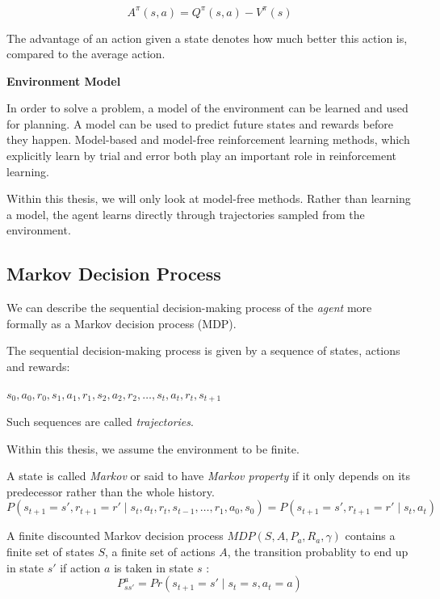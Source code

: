 \begin{equation}
A^\pi(s,a) = Q^\pi(s,a)-V^\pi(s)
\label{adv}
\end{equation}

The advantage of an action given a state denotes how much better this action is, compared to the average action.

\textbf{Environment Model}

In order to solve a problem, a model of the environment can be learned and used for planning. A model can be used to predict future states and rewards before they happen.
Model-based and model-free reinforcement learning methods, which explicitly learn by trial and error both play an important role in reinforcement learning.

Within this thesis, we will only look at model-free methods. Rather than learning a model, the agent learns directly through trajectories sampled from the environment.

\pagebreak

\subsection{Markov Decision Process} 

We can describe the sequential decision-making process of the \textit{agent} more formally as a Markov decision process (MDP).

The sequential decision-making process is given by a sequence of states, actions and rewards:

$s_0, a_0, r_0, s_1, a_1, r_1, s_2, a_2, r_2, \dots, s_t,a_t,r_t, s_{t+1}$

Such sequences are called \textit{trajectories}.

Within this thesis, we assume the environment to be finite.

A state is called \textit{Markov} or said to have \textit{Markov property} if it only depends on its predecessor rather than the whole history.
\begin{equation}
P(s_{t+1} = s', r_{t+1} = r' \mid s_t, a_t, r_t, s_{t-1}, \dots ,r_1,a_0,s_0) = P(s_{t+1} = s', r_{t+1} = r' \mid s_t,a_t)
\end{equation}

A finite discounted Markov decision process $MDP(S,A,P_a,R_a,\gamma)$ contains a finite set of states $S$, 
a finite set of actions $A$,
the transition probablity to end up in state $s'$ if action $a$ is taken in state $s$ : 
\begin{equation}
P^a_{s s'} = Pr(s_{t+1} = s' \mid s_t = s, a_t = a)
\end{equation}

